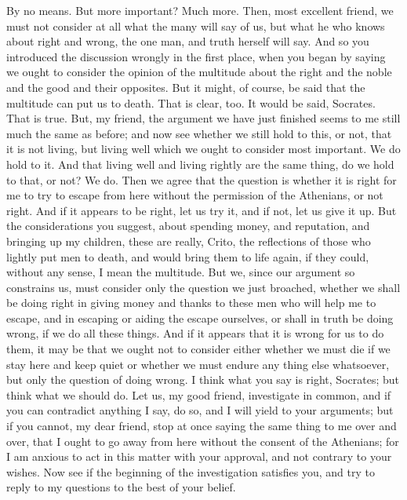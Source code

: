 \documentclass[letterpaper,12pt]{article}
\begin{document}
\begin{drama}
\critospeaks 
By no means.
\socratesspeaks 
But more important?
\critospeaks 
Much more.
\socratesspeaks 
Then, most excellent friend, we must not consider at all what the many will say of us, but what he who knows about right and wrong, the one man, and truth herself will say. And so you introduced the discussion wrongly in the first place, when you began by saying we ought to consider the opinion of the multitude about the right and the noble and the good and their opposites.  But it might, of course, be said that the multitude can put us to death.
\critospeaks 
That is clear, too. It would be said, Socrates.
\socratesspeaks 
That is true. But, my friend, the argument we have just finished seems to me still much the same as before; and now see whether we still hold to this, or not, that it is not living, but living well which we ought to consider most important.
\critospeaks 
We do hold to it.
\socratesspeaks 
And that living well and living rightly are the same thing, do we hold to that, or not?
\critospeaks 
We do.
\socratesspeaks 
Then we agree that the question is whether it is right for me to try to escape from here  without the permission of the Athenians, or not right. And if it appears to be right, let us try it, and if not, let us give it up. But the considerations you suggest, about spending money, and reputation, and bringing up my children, these are really, Crito, the reflections of those who lightly put men to death, and would bring them to life again, if they could, without any sense, I mean the multitude. But we, since our argument so constrains us, must consider only the question we just broached, whether we shall be doing right in giving money  and thanks to these men who will help me to escape, and in escaping or aiding the escape ourselves, or shall in truth be doing wrong, if we do all these things. And if it appears that it is wrong for us to do them, it may be that we ought not to consider either whether we must die if we stay here and keep quiet or whether we must endure any thing else whatsoever, but only the question of doing wrong.
\critospeaks 
I think what you say is right, Socrates; but think what we should do.
\socratesspeaks 
Let us, my good friend, investigate in common, and if you can contradict anything I say, do so, and I will yield to your arguments;  but if you cannot, my dear friend, stop at once saying the same thing to me over and over, that I ought to go away from here without the consent of the Athenians; for I am anxious to act in this matter with your approval, and not contrary to your wishes. Now see if the beginning of the investigation satisfies you, and try to reply  to my questions to the best of your belief.

\end{drama}
\end{document}
